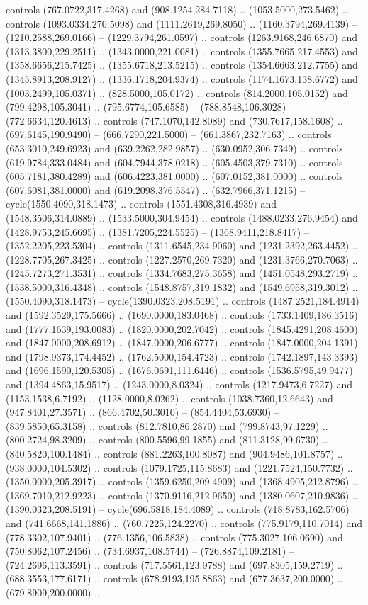 controls (767.0722,317.4268) and (908.1254,284.7118) .. (1053.5000,273.5462) .. controls (1093.0334,270.5098) and (1111.2619,269.8050) .. (1160.3794,269.4139) -- (1210.2588,269.0166) -- (1229.3794,261.0597) .. controls (1263.9168,246.6870) and (1313.3800,229.2511) .. (1343.0000,221.0081) .. controls (1355.7665,217.4553) and (1358.6656,215.7425) .. (1355.6718,213.5215) .. controls (1354.6663,212.7755) and (1345.8913,208.9127) .. (1336.1718,204.9374) .. controls (1174.1673,138.6772) and (1003.2499,105.0371) .. (828.5000,105.0172) .. controls (814.2000,105.0152) and (799.4298,105.3041) .. (795.6774,105.6585) -- (788.8548,106.3028) -- (772.6634,120.4613) .. controls (747.1070,142.8089) and (730.7617,158.1608) .. (697.6145,190.9490) -- (666.7290,221.5000) -- (661.3867,232.7163) .. controls (653.3010,249.6923) and (639.2262,282.9857) .. (630.0952,306.7349) .. controls (619.9784,333.0484) and (604.7944,378.0218) .. (605.4503,379.7310) .. controls (605.7181,380.4289) and (606.4223,381.0000) .. (607.0152,381.0000) .. controls (607.6081,381.0000) and (619.2098,376.5547) .. (632.7966,371.1215) -- cycle(1550.4090,318.1473) .. controls (1551.4308,316.4939) and (1548.3506,314.0889) .. (1533.5000,304.9454) .. controls (1488.0233,276.9454) and (1428.9753,245.6695) .. (1381.7205,224.5525) -- (1368.9411,218.8417) -- (1352.2205,223.5304) .. controls (1311.6545,234.9060) and (1231.2392,263.4452) .. (1228.7705,267.3425) .. controls (1227.2570,269.7320) and (1231.3766,270.7063) .. (1245.7273,271.3531) .. controls (1334.7683,275.3658) and (1451.0548,293.2719) .. (1538.5000,316.4348) .. controls (1548.8757,319.1832) and (1549.6958,319.3012) .. (1550.4090,318.1473) -- cycle(1390.0323,208.5191) .. controls (1487.2521,184.4914) and (1592.3529,175.5666) .. (1690.0000,183.0468) .. controls (1733.1409,186.3516) and (1777.1639,193.0083) .. (1820.0000,202.7042) .. controls (1845.4291,208.4600) and (1847.0000,208.6912) .. (1847.0000,206.6777) .. controls (1847.0000,204.1391) and (1798.9373,174.4452) .. (1762.5000,154.4723) .. controls (1742.1897,143.3393) and (1696.1590,120.5305) .. (1676.0691,111.6446) .. controls (1536.5795,49.9477) and (1394.4863,15.9517) .. (1243.0000,8.0324) .. controls (1217.9473,6.7227) and (1153.1538,6.7192) .. (1128.0000,8.0262) .. controls (1038.7360,12.6643) and (947.8401,27.3571) .. (866.4702,50.3010) -- (854.4404,53.6930) -- (839.5850,65.3158) .. controls (812.7810,86.2870) and (799.8743,97.1229) .. (800.2724,98.3209) .. controls (800.5596,99.1855) and (811.3128,99.6730) .. (840.5820,100.1484) .. controls (881.2263,100.8087) and (904.9486,101.8757) .. (938.0000,104.5302) .. controls (1079.1725,115.8683) and (1221.7524,150.7732) .. (1350.0000,205.3917) .. controls (1359.6250,209.4909) and (1368.4905,212.8796) .. (1369.7010,212.9223) .. controls (1370.9116,212.9650) and (1380.0607,210.9836) .. (1390.0323,208.5191) -- cycle(696.5818,184.4089) .. controls (718.8783,162.5706) and (741.6668,141.1886) .. (760.7225,124.2270) .. controls (775.9179,110.7014) and (778.3302,107.9401) .. (776.1356,106.5838) .. controls (775.3027,106.0690) and (750.8062,107.2456) .. (734.6937,108.5744) -- (726.8874,109.2181) -- (724.2696,113.3591) .. controls (717.5561,123.9788) and (697.8305,159.2719) .. (688.3553,177.6171) .. controls (678.9193,195.8863) and (677.3637,200.0000) .. (679.8909,200.0000) .. 